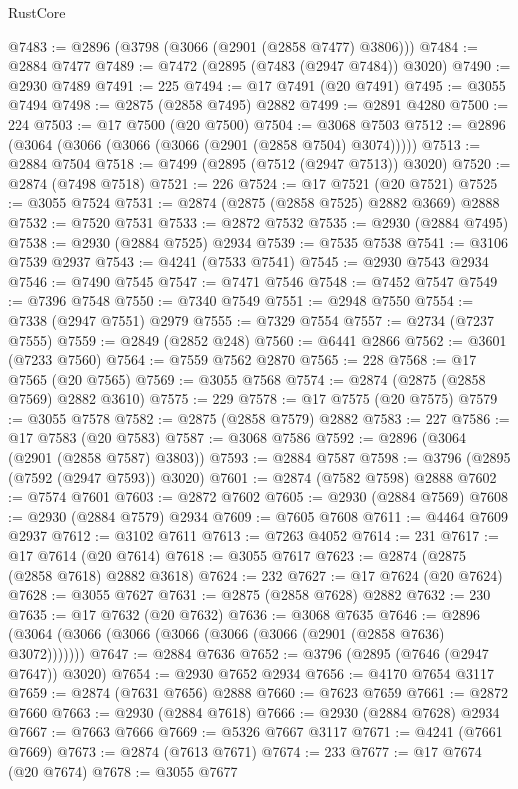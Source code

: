 \begin{lexlean}{RustCore}
\begin{coremodule}
@7483 := @2896 (@3798 (@3066 (@2901 (@2858 @7477) @3806)))
@7484 := @2884 @7477
@7489 := @7472 (@2895 (@7483 (@2947 @7484)) @3020)
@7490 := @2930 @7489
@7491 := 225
@7494 := @17 @7491 (@20 @7491)
@7495 := @3055 @7494
@7498 := @2875 (@2858 @7495) @2882
@7499 := @2891 @4280
@7500 := 224
@7503 := @17 @7500 (@20 @7500)
@7504 := @3068 @7503
@7512 := @2896 (@3064 (@3066 (@3066 (@3066 (@2901 (@2858 @7504) @3074)))))
@7513 := @2884 @7504
@7518 := @7499 (@2895 (@7512 (@2947 @7513)) @3020)
@7520 := @2874 (@7498 @7518)
@7521 := 226
@7524 := @17 @7521 (@20 @7521)
@7525 := @3055 @7524
@7531 := @2874 (@2875 (@2858 @7525) @2882 @3669) @2888
@7532 := @7520 @7531
@7533 := @2872 @7532
@7535 := @2930 (@2884 @7495)
@7538 := @2930 (@2884 @7525) @2934
@7539 := @7535 @7538
@7541 := @3106 @7539 @2937
@7543 := @4241 (@7533 @7541)
@7545 := @2930 @7543 @2934
@7546 := @7490 @7545
@7547 := @7471 @7546
@7548 := @7452 @7547
@7549 := @7396 @7548
@7550 := @7340 @7549
@7551 := @2948 @7550
@7554 := @7338 (@2947 @7551) @2979
@7555 := @7329 @7554
@7557 := @2734 (@7237 @7555)
@7559 := @2849 (@2852 @248)
@7560 := @6441 @2866
@7562 := @3601 (@7233 @7560)
@7564 := @7559 @7562 @2870
@7565 := 228
@7568 := @17 @7565 (@20 @7565)
@7569 := @3055 @7568
@7574 := @2874 (@2875 (@2858 @7569) @2882 @3610)
@7575 := 229
@7578 := @17 @7575 (@20 @7575)
@7579 := @3055 @7578
@7582 := @2875 (@2858 @7579) @2882
@7583 := 227
@7586 := @17 @7583 (@20 @7583)
@7587 := @3068 @7586
@7592 := @2896 (@3064 (@2901 (@2858 @7587) @3803))
@7593 := @2884 @7587
@7598 := @3796 (@2895 (@7592 (@2947 @7593)) @3020)
@7601 := @2874 (@7582 @7598) @2888
@7602 := @7574 @7601
@7603 := @2872 @7602
@7605 := @2930 (@2884 @7569)
@7608 := @2930 (@2884 @7579) @2934
@7609 := @7605 @7608
@7611 := @4464 @7609 @2937
@7612 := @3102 @7611
@7613 := @7263 @4052
@7614 := 231
@7617 := @17 @7614 (@20 @7614)
@7618 := @3055 @7617
@7623 := @2874 (@2875 (@2858 @7618) @2882 @3618)
@7624 := 232
@7627 := @17 @7624 (@20 @7624)
@7628 := @3055 @7627
@7631 := @2875 (@2858 @7628) @2882
@7632 := 230
@7635 := @17 @7632 (@20 @7632)
@7636 := @3068 @7635
@7646 := @2896 (@3064 (@3066 (@3066 (@3066 (@3066 (@3066 (@2901 (@2858 @7636) @3072)))))))
@7647 := @2884 @7636
@7652 := @3796 (@2895 (@7646 (@2947 @7647)) @3020)
@7654 := @2930 @7652 @2934
@7656 := @4170 @7654 @3117
@7659 := @2874 (@7631 @7656) @2888
@7660 := @7623 @7659
@7661 := @2872 @7660
@7663 := @2930 (@2884 @7618)
@7666 := @2930 (@2884 @7628) @2934
@7667 := @7663 @7666
@7669 := @5326 @7667 @3117
@7671 := @4241 (@7661 @7669)
@7673 := @2874 (@7613 @7671)
@7674 := 233
@7677 := @17 @7674 (@20 @7674)
@7678 := @3055 @7677

\end{coremodule}
\end{lexlean}
